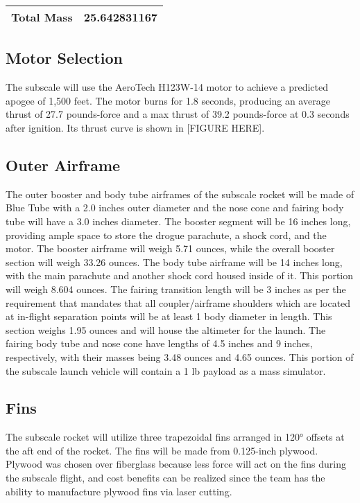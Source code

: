 \begin{tabularx}{0.8\linewidth}{X l}
Total Mass & 25.642831167 \\ \hline

\hline
\end{tabularx}

    \subsection{Motor Selection}
    The subscale will use the AeroTech H123W-14 motor to achieve a predicted apogee of 1,500 feet. The motor burns for 1.8 seconds, producing an average thrust of 27.7 pounds-force and a max thrust of 39.2 pounds-force at 0.3 seconds after ignition. Its thrust curve is shown in [FIGURE HERE].

    
    
    \subsection{Outer Airframe}
The outer booster and body tube airframes of the subscale rocket will be made of Blue Tube with a 2.0 inches outer diameter and the nose cone and fairing body tube will have a 3.0 inches diameter. The booster segment will be 16 inches long, providing ample space to store the drogue parachute, a shock cord, and the motor. The booster airframe will weigh 5.71 ounces, while the overall booster section will weigh 33.26 ounces. The body tube airframe will be 14 inches long, with the main parachute and another shock cord housed inside of it. This portion will weigh 8.604 ounces. The fairing transition length will be 3 inches as per the requirement that mandates that all coupler/airframe shoulders which are located at in-flight separation points will be at least 1 body diameter in length. This section weighs 1.95 ounces and will house the altimeter for the launch. The fairing body tube and nose cone have lengths of 4.5 inches and 9 inches, respectively, with their masses being 3.48 ounces and 4.65 ounces. This portion of the subscale launch vehicle will contain a 1 lb payload as a mass simulator.

    \subsection{Fins}
The subscale rocket will utilize three trapezoidal fins arranged in 120° offsets at the aft end of the rocket. The fins will be made from 0.125-inch plywood. Plywood was chosen over fiberglass because less force will act on the fins during the subscale flight, and cost benefits can be realized since the team has the ability to manufacture plywood fins via laser cutting.

